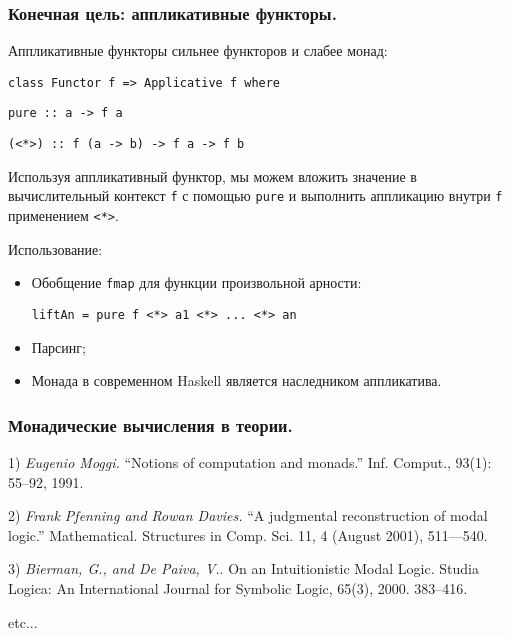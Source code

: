\documentclass[10pt,pdf,utf8,russian,aspectratio=169]{beamer}
\begin{document}
\begin{frame}
\frametitle{Конечная цель: аппликативные функторы.}


Аппликативные функторы сильнее функторов и слабее монад:

\vspace{\baselineskip}

\verb"class Functor f => Applicative f where"

\quad\quad \verb"pure :: a -> f a"

\quad\quad \verb"(<*>) :: f (a -> b) -> f a -> f b"

\vspace{\baselineskip}

Используя аппликативный функтор, мы можем вложить значение в вычислительный контекст \verb"f" с помощью \verb"pure" и выполнить
аппликацию внутри \verb"f" применением \verb"<*>".

\vspace{\baselineskip}

Использование:
\begin{itemize}
\item Обобщение \verb"fmap" для функции произвольной арности:

\verb"liftAn = pure f <*> a1 <*> ... <*> an"
\item Парсинг;
\item Монада в современном Haskell является наследником аппликатива.
\end{itemize}
\end{frame}

\begin{frame}
\frametitle{Монадические вычисления в теории.}

1) \emph{Eugenio Moggi.} ``Notions of computation and monads.'' Inf. Comput., 93(1): 55--92, 1991.

\vspace{\baselineskip}

2) \emph{Frank Pfenning and Rowan Davies.}  ``A judgmental reconstruction of modal logic.'' Mathematical. Structures in Comp. Sci. 11, 4 (August 2001), 511---540.

\vspace{\baselineskip}

3) \emph{Bierman, G., and De Paiva, V.}. On an Intuitionistic Modal Logic. Studia Logica: An International Journal for Symbolic Logic, 65(3), 2000. 383--416.

etc...
\end{frame}
\end{document}
